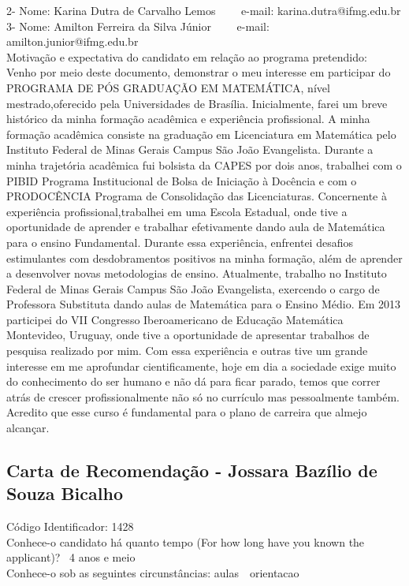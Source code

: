 \documentclass[11pt]{article}
\begin{document}
2- Nome: Karina Dutra de Carvalho Lemos
\ \ \ \ e-mail: karina.dutra@ifmg.edu.br
\\
3- Nome: Amilton Ferreira da Silva Júnior
\ \ \ \ e-mail: amilton.junior@ifmg.edu.br
\\[0.2cm]
Motivação e expectativa do candidato em relação ao programa pretendido:
\\Venho por meio deste documento, demonstrar o meu interesse em participar do PROGRAMA DE PÓS GRADUAÇÃO EM MATEMÁTICA, nível mestrado,oferecido pela Universidades de Brasília. Inicialmente, farei um breve histórico da minha formação acadêmica e experiência profissional. A minha formação acadêmica consiste na graduação em Licenciatura em Matemática pelo Instituto Federal de Minas Gerais Campus São João Evangelista. Durante a minha trajetória acadêmica fui bolsista da CAPES por dois anos, trabalhei com o PIBID Programa Institucional de Bolsa de Iniciação à Docência e com o PRODOCÊNCIA Programa de Consolidação das Licenciaturas. Concernente à experiência profissional,trabalhei em uma Escola Estadual, onde tive a oportunidade de aprender e trabalhar efetivamente dando aula de Matemática para o ensino Fundamental.  Durante essa experiência, enfrentei desafios estimulantes com desdobramentos positivos na minha formação, além de aprender a desenvolver novas metodologias de ensino. Atualmente, trabalho no Instituto Federal de Minas Gerais Campus São João Evangelista, exercendo o cargo de Professora Substituta dando aulas de Matemática para o Ensino Médio.  Em 2013 participei do VII Congresso Iberoamericano de Educação Matemática Montevideo, Uruguay, onde tive a oportunidade de apresentar trabalhos de pesquisa realizado por mim. Com essa experiência e outras tive um grande interesse em me aprofundar cientificamente, hoje em dia a sociedade exige muito do conhecimento do ser humano e não dá para ficar parado, temos que correr atrás de crescer profissionalmente não só no currículo mas pessoalmente também. Acredito que esse curso é fundamental para o plano de carreira que almejo alcançar.\newpage\vspace*{-4cm}\subsection*{Carta de Recomendação - Jossara Bazílio de Souza Bicalho}Código Identificador: 1428\\Conhece-o candidato há quanto tempo (For how long have you known the applicant)? 
\ 4 anos e meio
\\ Conhece-o sob as seguintes circunstâncias: aulas\ \ orientacao
\end{document}
